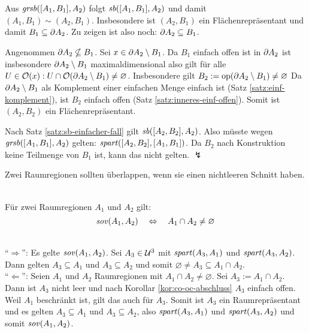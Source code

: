     \begin{bew}
        Aus $\mathit{gr\hspace*{-0.25ex}sb}([A_1,B_1],A_2)$ folgt $\mathit{sb}([A_1,B_1],A_2)$ und damit\\
        $(A_1,B_1) \sim (A_2,B_1)$.
        Insbesondere ist $(A_2,B_1)$ ein Flächenrepräsentant und damit $B_1 \subseteq \partial A_2$.
        Zu zeigen ist also noch: $\partial A_2 \subseteq B_1$.

        Angenommen $\partial A_2 \nsubseteq B_1$.
        Sei $x \in \partial A_2 \setminus B_1$. 
        Da $B_1$ einfach offen ist in $\partial A_2$ ist insbesondere $\partial A_2 \setminus B_1$ maximaldimensional also gilt für alle $U \in \mathcal{O}(x): U \cap \mathcal{O}(\partial A_2 \setminus B_1) \neq \varnothing$.
        Insbesondere gilt $B_2 := \text{op}(\partial A_2 \setminus B_1) \neq \varnothing$
        Da $\partial A_2 \setminus B_1$ als Komplement einer einfachen Menge einfach ist (Satz \ref{satz:einf-komplement}), ist $B_2$ einfach offen (Satz \ref{satz:inneres-einf-offen}).
        Somit ist $(A_2,B_2)$ ein Flächenrepräsentant.

        Nach Satz \ref{satz:sb-einfacher-fall} gilt $\mathit{sb}([A_2,B_2],A_2)$.
        Also müsste wegen\\
        $\mathit{gr\hspace*{-0.25ex}sb}([A_1,B_1],A_2)$ gelten: $\mathit{spart}([A_2,B_2],[A_1,B_1])$.
        Da $B_2$ nach Konstruktion keine Teilmenge von $B_1$ ist, kann das nicht gelten. $\lightning$
    \end{bew}
%    
%    
%    
    Zwei Raumregionen sollten überlappen, wenn sie einen nichtleeren Schnitt haben.
    \begin{satz}\label{satz:sov-raumreg}\ \\
        Für zwei Raumregionen $A_1$ und $A_2$ gilt: 
        $$\mathit{sov}(A_1,A_2) \quad \Leftrightarrow \quad A_1 \cap A_2 \neq \varnothing$$
    \end{satz}
    \begin{bew}\ \\
        ``$\boldsymbol{\Rightarrow}$'':
        Es gelte $\mathit{sov}(A_1,A_2)$. 
        Sei $A_3 \in \mathcal{U}^3$ mit $\mathit{spart}(A_3,A_1)$ und $\mathit{spart}(A_3,A_2)$.
        Dann gelten $A_3 \subseteq A_1$ und $A_3 \subseteq A_2$ und somit $\varnothing \neq A_3 \subseteq A_1 \cap A_2$.\\
        ``$\boldsymbol{\Leftarrow}$'':
        Seien $A_1$ und $A_2$ Raumregionen mit $A_1 \cap A_2 \neq \varnothing$.
        Sei $A_3 := A_1 \cap A_2$.
        Dann ist $A_3$ nicht leer und nach Korollar \ref{kor:co-oc-abschluss} $A_3$ einfach offen.
        Weil $A_1$ beschränkt ist, gilt das auch für $A_3$.
        Somit ist $A_3$ ein Raumrepräsentant und es gelten $A_3 \subseteq A_1$ und $A_3 \subseteq A_2$, also $\mathit{spart}(A_3,A_1)$ und $\mathit{spart}(A_3,A_2)$ und somit $\mathit{sov}(A_1,A_2)$.
    \end{bew}



